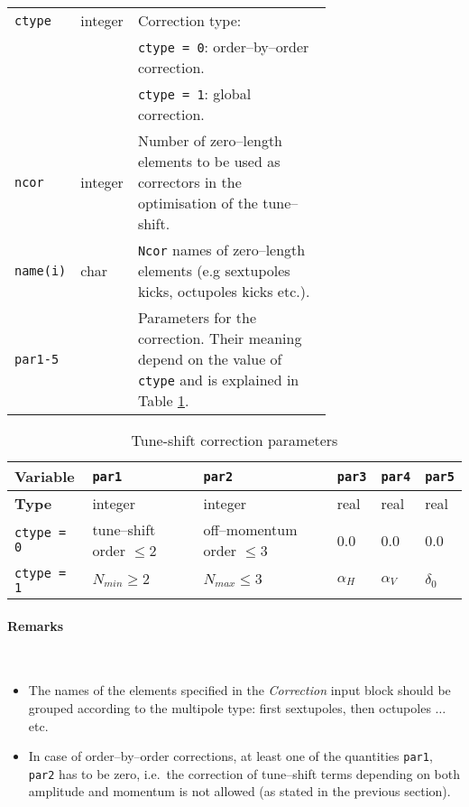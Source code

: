 \bigskip
\begin{longtabu}{@{}llp{0.7\linewidth}}
    \texttt{ctype}   & integer & Correction type: \\
                     &         & \texttt{ctype = 0}: order--by--order correction. \\
                     &         & \texttt{ctype = 1}: global correction. \\
    \texttt{ncor}    & integer & Number of zero--length elements to be used as correctors in the optimisation of the tune--shift. \\
    \texttt{name(i)} & char    & \texttt{Ncor} names of zero--length elements (e.g sextupoles kicks, octupoles kicks etc.). \\
    \texttt{par1-5}  &         & Parameters for the correction. Their meaning depend on the value of \texttt{ctype} and is  explained in Table \ref{tab:CORR}. \\
\end{longtabu}

\begin{table}[h]
\begin{center}
    \caption{Tune-shift correction parameters}
    \label{tab:CORR}
    \begin{tabular}{|l|p{2cm}|p{2.6cm}|p{1.8cm}|p{1.8cm}|p{1.8cm}|}
    \hline
    \rowcolor{blue!30}
    \textbf{Variable} & \texttt{par1} & \texttt{par2} & \texttt{par3} & \texttt{par4} & \texttt{par5} \\
    \hline
    
    \rowcolor{blue!15}
    \textbf{Type} & integer & integer & real & real & real \\
    \hline
    
    \texttt{ctype = 0} & tune--shift order $\leq 2$ & off--momentum order $\leq 3$ & 0.0 & 0.0 & 0.0 \\
    \hline
    
    \texttt{ctype = 1} & $N_{min}\geq 2$ & $N_{max}\leq 3$ & $\alpha_H$ & $\alpha_V$ & $\delta_0 $ \\
    \hline
    \end{tabular}
\end{center}
\end{table}

\paragraph{Remarks}~
\begin{itemize}
    \item The names of the elements specified in the \textit{Correction} input block should be grouped according to the multipole type: first sextupoles, then octupoles $\ldots$ etc.
    \item In case of order--by--order corrections, at least one of the quantities \texttt{par1}, \texttt{par2} has to be zero, i.e.\ the correction of tune--shift terms depending on both amplitude and momentum is not allowed (as stated in the previous section).
\end{itemize}

